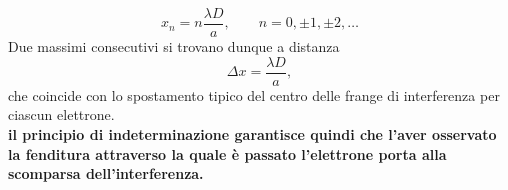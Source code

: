 \begin{equation}
x_n =n\frac{\lambda D}{a}, \qquad n=0,\pm 1, \pm 2, \dots 
\end{equation}
Due massimi consecutivi si trovano dunque a distanza 
\begin{equation}
\Delta x = \frac{\lambda D}{a},
\end{equation}
che coincide con lo spostamento tipico del centro delle frange di interferenza per ciascun elettrone.\\
\textbf{il principio di indeterminazione garantisce quindi che l'aver osservato la fenditura attraverso la quale è passato l'elettrone porta alla scomparsa dell'interferenza.}